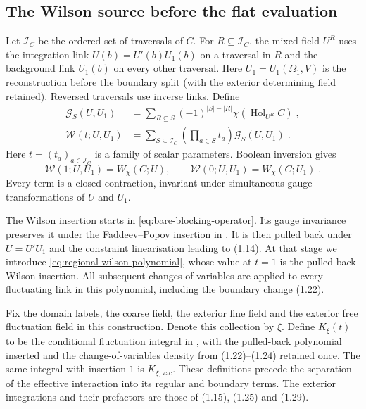 \documentclass[11pt]{article}
\newcommand{\Hol}{\operatorname{Hol}}
\begin{document}
\subsection{The Wilson source before the flat evaluation}

Let $\mathcal I_C$ be the ordered set of traversals of $C$. For $R\subseteq\mathcal I_C$, the mixed field $U^R$ uses the integration link $U(b)=U'(b)U_1(b)$ on a traversal in $R$ and the background link $U_1(b)$ on every other traversal. Here $U_1=U_1(\Omega_1,V)$ is the reconstruction before the boundary split (with the exterior determining field retained). Reversed traversals use inverse links. Define
\begin{equation}\label{eq:regional-wilson-polynomial}
    \begin{aligned}
        \mathcal G_S(U,U_1)
            &=\sum_{R\subseteq S}(-1)^{|S|-|R|}
                \chi(\Hol_{U^R}C)\;,\\
        \mathcal W(t;U,U_1)
            &=\sum_{S\subseteq\mathcal I_C}
                \left(\prod_{a\in S}t_a\right)\mathcal G_S(U,U_1)\;.
    \end{aligned}
\end{equation}
Here $t=(t_a)_{a\in\mathcal I_C}$ is a family of scalar parameters. Boolean inversion gives
\begin{equation}
    \mathcal W(1;U,U_1)=W_\chi(C;U),
    \qquad \mathcal W(0;U,U_1)=W_\chi(C;U_1)\;.
\end{equation}
Every term is a closed contraction, invariant under simultaneous gauge transformations of $U$ and $U_1$.

The Wilson insertion starts in \eqref{eq:bare-blocking-operator}. Its gauge invariance preserves it under the Faddeev--Popov insertion in \cite[(1.5)--(1.6)]{BalabanCRE}. It is then pulled back under $U=U'U_1$ and the constraint linearisation leading to (1.14). At that stage we introduce \eqref{eq:regional-wilson-polynomial}, whose value at $t=1$ is the pulled-back Wilson insertion. All subsequent changes of variables are applied to every fluctuating link in this polynomial, including the boundary change (1.22).

Fix the domain labels, the coarse field, the exterior fine field and the exterior free fluctuation field in this construction. Denote this collection by $\xi$. Define $K_\xi(t)$ to be the conditional fluctuation integral in \cite[(1.26)]{BalabanCRE}, with the pulled-back polynomial inserted and the change-of-variables density from (1.22)--(1.24) retained once. The same integral with insertion $1$ is $K_{\xi,\mathrm{vac}}$. These definitions precede the separation of the effective interaction into its regular and boundary terms. The exterior integrations and their prefactors are those of (1.15), (1.25) and (1.29).
\end{document}
